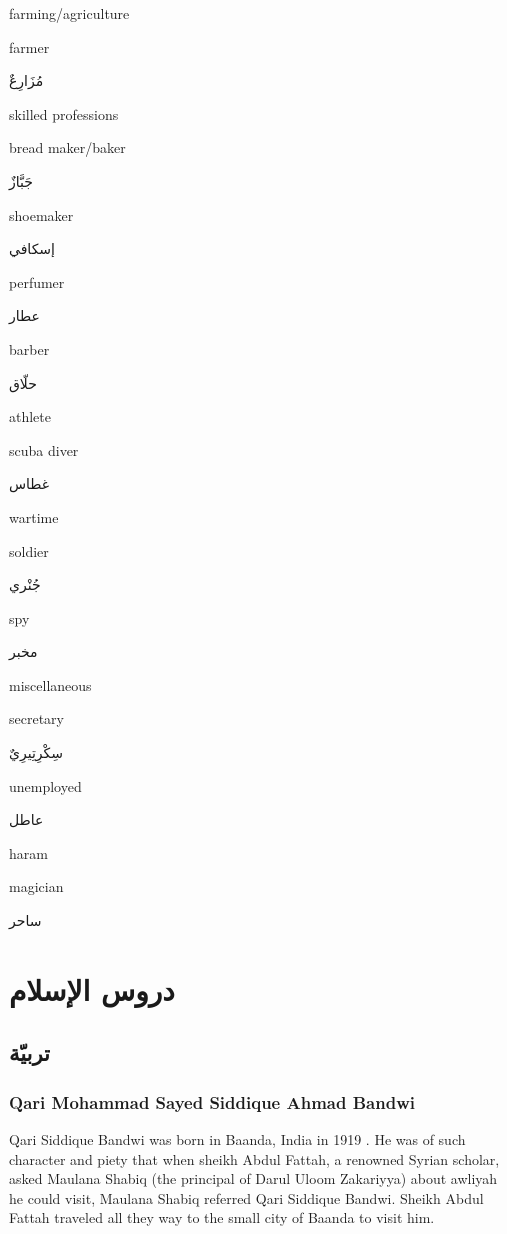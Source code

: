 \documentclass[]{book}
\begin{document}
{farming/agriculture}

farmer

مُزَارِعٌ

{skilled professions}

bread maker/baker

جَبَّازٌ

shoemaker

إسكافي

perfumer

عطار

barber

حلّاق

{athlete}

scuba diver

غطاس

{wartime}

soldier

جُنْري

spy

مخبر

{miscellaneous}

secretary

سِكْرِتِيرِيٌ

unemployed

عاطل

{haram}

magician

ساحر

\hypertarget{part-ux62fux631ux648ux633-ux627ux644ux625ux633ux644ux627ux645}{%
\part{دروس الإسلام}\label{part-ux62fux631ux648ux633-ux627ux644ux625ux633ux644ux627ux645}}

\hypertarget{tarbiyya}{%
\chapter{تربيّة}\label{tarbiyya}}

\hypertarget{qari-siddique}{%
\section{Qari Mohammad Sayed Siddique Ahmad Bandwi}\label{qari-siddique}}

Qari Siddique Bandwi was born in Baanda, India in 1919 \citep{bundelkhand}. He was of such character and piety that when sheikh Abdul Fattah, a renowned Syrian scholar, asked Maulana Shabiq (the principal of Darul Uloom Zakariyya) about awliyah he could visit, Maulana Shabiq referred Qari Siddique Bandwi. Sheikh Abdul Fattah traveled all they way to the small city of Baanda to visit him.
\end{document}
